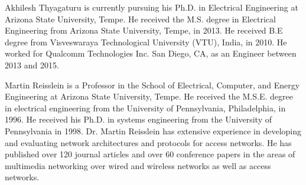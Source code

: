 \documentclass[journal,twoside,comsoc]{IEEEtran}
\begin{document}
\begin{IEEEbiography}{Akhilesh Thyagaturu}
is currently pursuing his Ph.D. in Electrical Engineering at Arizona State University, Tempe. He received the M.S. degree in Electrical Engineering from Arizona State University, Tempe, in 2013. He received B.E degree from Visveswaraya Technological University (VTU), India, in 2010. He worked for Qualcomm Technologies Inc. San Diego, CA, as an Engineer between 2013 and 2015. 
\end{IEEEbiography}

\begin{IEEEbiography}{Martin Reisslein}
is a Professor in the School of Electrical, Computer, and Energy Engineering at Arizona State University, Tempe. He received the M.S.E. degree in electrical engineering from the University of Pennsylvania, Philadelphia, in 1996. He received his Ph.D. in systems engineering from the University of Pennsylvania in 1998.  Dr. Martin Reisslein has extensive experience in developing and evaluating network architectures and protocols for access networks. He has published over 120 journal articles and over 60 conference papers in the areas of multimedia networking over wired and wireless networks as well as access networks.  
\end{IEEEbiography}
\end{document}
